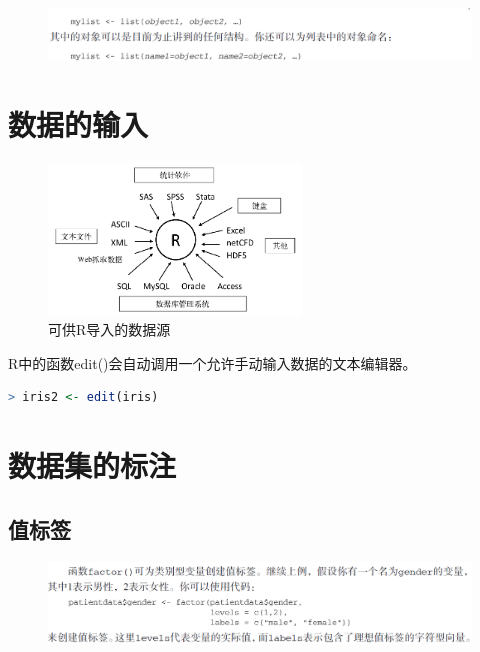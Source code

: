 \documentclass[11pt,a4paper,oneside]{book}
\begin{document}
\begin{figure}[H]
	\centering
	\includegraphics[width=\textwidth]{screenshot003}
\end{figure}

\section{数据的输入}
\begin{figure}[H]
	\centering
	\includegraphics[width=0.6\textwidth]{screenshot004}
	\caption{可供R导入的数据源}
	\label{fig:screenshot004}
\end{figure}

R中的函数edit()会自动调用一个允许手动输入数据的文本编辑器。
\begin{lstlisting}[language=R]
> iris2 <- edit(iris)
\end{lstlisting}

\section{数据集的标注}
\subsection{值标签}
\begin{figure}[H]
	\centering
	\includegraphics[width=\textwidth]{screenshot005}
\end{figure}
\end{document}
